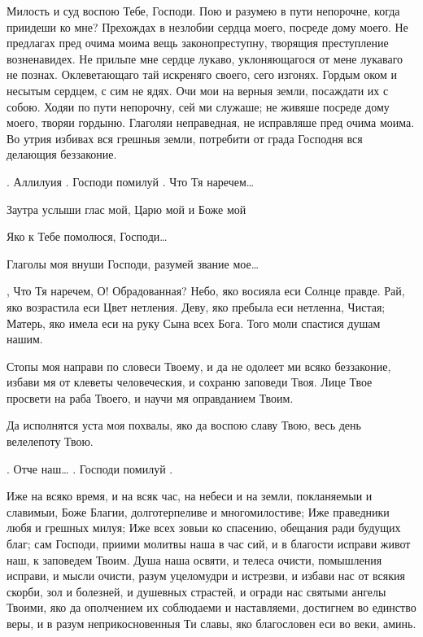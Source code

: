 \begin{mymulticols}


Милость и суд воспою Тебе, Господи. Пою и разумею в пути непорочне, когда приидеши ко мне? Прехождах в незлобии сердца моего, посреде дому моего. Не предлагах пред очима моима вещь законопреступну, творящия преступление возненавидех. Не прильпе мне сердце лукаво, уклоняющагося от мене лукаваго не познах. Оклеветающаго тай искреняго своего, сего изгонях. Гордым оком и несытым сердцем, с сим не ядях. Очи мои на верныя земли, посаждати их с собою. Ходяи по пути непорочну, сей ми служаше; не живяше посреде дому моего, творяи гордыню. Глаголяи неправедная, не исправляше пред очима моима. Во утрия избивах вся грешныя земли, потребити от града Господня вся делающия беззаконие. 

. Аллилуия . Господи помилуй .  Что Тя наречем…


 Заутра услыши глас мой, Царю мой и Боже мой 

 Яко к Тебе помолюся, Господи…

 Глаголы моя внуши Господи, разумей звание мое…

,  Что Тя наречем, О! Обрадованная? Небо, яко восияла еси Солнце правде. Рай, яко возрастила еси Цвет нетления. Деву, яко пребыла еси нетленна, Чистая; Матерь, яко имела еси на руку Сына всех Бога. Того моли спастися душам нашим.


 Стопы моя направи по словеси Твоему, и да не одолеет ми всяко беззаконие, избави мя от клеветы человеческия, и сохраню заповеди Твоя. Лице Твое просвети на раба Твоего, и научи мя оправданием Твоим.

Да исполнятся уста моя похвалы, яко да воспою славу Твою, весь день велелепоту Твою. 

.  Отче наш… . Господи помилуй .

 Иже на всяко время, и на всяк час, на небеси и на земли, покланяемыи и славимыи, Боже Благии, долготерпеливе и многомилостиве; Иже праведники любя и грешных милуя; Иже всех зовыи ко спасению, обещания ради будущих благ; сам Господи, приими молитвы наша в час сий, и в благости исправи живот наш, к заповедем Твоим. Душа наша освяти, и телеса очисти, помышления исправи, и мысли очисти, разум уцеломудри и истрезви, и избави нас от всякия скорби, зол и болезней, и душевных страстей, и огради нас святыми ангелы Твоими, яко да ополчением их соблюдаеми и наставляеми, достигнем во единство веры, и в разум неприкосновенныя Ти славы, яко благословен еси во веки, аминь. 


\end{mymulticols}
